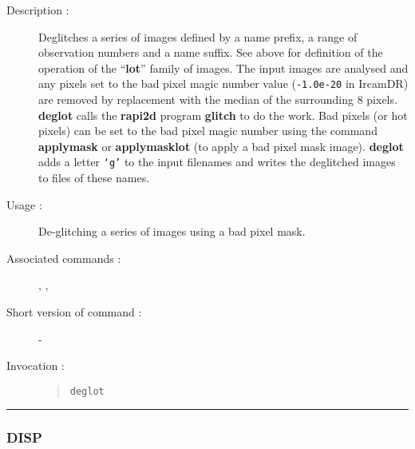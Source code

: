 \begin{description}

\item[Description :] Deglitches a series of images defined by a name
prefix, a range of observation numbers and a name suffix.  See above
for definition of the operation of the ``{\bf lot}'' family of images.
The input images are analysed and any pixels set to the bad pixel magic
number value ({\tt -1.0e-20} in {\sc IrcamDR}) are removed by replacement
with the median of the surrounding 8 pixels.  {\bf deglot} calls the {\bf
rapi2d} program {\bf glitch} to do the work.  Bad pixels (or hot pixels) can
be set to the bad pixel magic number using the command {\bf applymask} or
{\bf applymasklot} (to apply a bad pixel mask image).  {\bf deglot}
adds a letter {\tt `g'} to the input filenames and writes the deglitched
images to files of these names.

\item[Usage :] De-glitching a series of images using a bad pixel mask.
\item[Associated commands :] {\tt {}},
{\tt {}},
{\tt {}}
\item[Short version of command :] -
\item[Invocation :]

\begin{quote}{\tt  deglot }\end{quote}

\end{description}

\hrule
\subsubsection*{\label{DISP}DISP}

